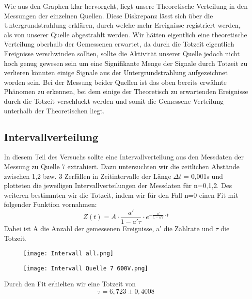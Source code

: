 \documentclass{article}
\begin{document}
            Wie aus den Graphen klar hervorgeht, liegt unsere Theoretische Verteilung in den Messungen der einzelnen
            Quellen. Diese Diskrepanz lässt sich über die Untergrundstrahlung erklären, durch welche 
            mehr Ereignisse registriert werden, als von unserer Quelle abgestrahlt werden. Wir hätten eigentlich eine 
            theoretische Verteilung oberhalb der Gemessenen erwartet, da durch die Totzeit eigentlich Ereignisse verschwinden
            sollten, sollte die Aktivität unserer Quelle jedoch nicht hoch genug gewesen sein um eine Signifikante Menge 
            der Signale durch Totzeit zu verlieren könnten einige Signale aus der Untergrundstrahlung aufgezeichnet worden sein.
            Bei der Messung beider Quellen ist das oben bereits erwähnte Phänomen zu erkennen, bei dem einige der Theoretisch
            zu erwartenden Ereignisse durch die Totzeit verschluckt werden und somit die Gemessene Verteilung unterhalb der Theoretischen
            liegt.

        \subsection{Intervallverteilung}
            In diesem Teil des Versuchs sollte eine Intervallverteilung aus den Messdaten der Messung zu Quelle 7
            extrahiert. Dazu untersuchten wir die zeitlichen Abstände zwischen 1,2 bzw. 3 Zerfällen in Zeitintervalle der Länge 
            $\Delta t$ = 0,001s und plotteten die jeweiligen Intervallverteilungen der Messdaten für n=0,1,2.
            Des weiteren bestimmten wir die Totzeit, indem wir für den Fall n=0 einen Fit mit folgender Funktion vornahmen:
            $$Z(t) = A\cdot\frac{a'}{1-a'\tau}\cdot e^{-\frac{a'}{1-a'\tau}\cdot t}$$
            Dabei ist A die Anzahl der gemessenen Ereignisse, a' die Zählrate und $\tau$ die Totzeit.
             \begin{figure}[H]
                 \centering
                 \texttt{[image: Intervall all.png]}
                 \label{fig:Intervall plot n=0,1,2}
             \end{figure}

            \begin{figure}[H]
                \centering
                \texttt{[image: Intervall Quelle 7 600V.png]}
                \label{fig:Intervall fit, Quelle 7 600V}
            \end{figure}

            Durch den Fit erhielten wir eine Totzeit von 
            $$\tau = 6,723 \pm 0,4008$$
        
\end{document}
